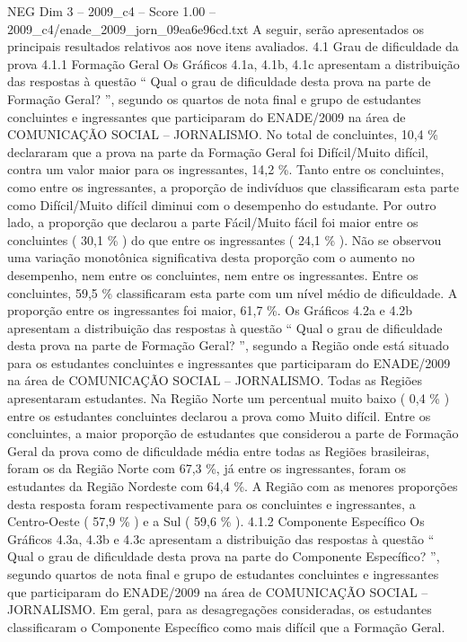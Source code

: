 \begin{textsample}{NEG Dim 3 – 2009\_c4 – Score 1.00 – 2009\_c4/enade\_2009\_jorn\_09ea6e96cd.txt}
A seguir, serão apresentados os principais resultados relativos aos nove itens avaliados. 4.1 Grau de dificuldade da prova 4.1.1 Formação Geral Os Gráficos 4.1a, 4.1b, 4.1c apresentam a distribuição das respostas à questão “ Qual o grau de dificuldade desta prova na parte de Formação Geral? ”, segundo os quartos de nota final e grupo de estudantes concluintes e ingressantes que participaram do ENADE/2009 na área de COMUNICAÇÃO SOCIAL – JORNALISMO.
No total de concluintes, 10,4 \% declararam que a prova na parte da Formação Geral foi Difícil/Muito difícil, contra um valor maior para os ingressantes, 14,2 \%.
Tanto entre os concluintes, como entre os ingressantes, a proporção de indivíduos que classificaram esta parte como Difícil/Muito difícil diminui com o desempenho do estudante.
Por outro lado, a proporção que declarou a parte Fácil/Muito fácil foi maior entre os concluintes ( 30,1 \% ) do que entre os ingressantes ( 24,1 \% ).
Não se observou uma variação monotônica significativa desta proporção com o aumento no desempenho, nem entre os concluintes, nem entre os ingressantes.
Entre os concluintes, 59,5 \% classificaram esta parte com um nível médio de dificuldade.
A proporção entre os ingressantes foi maior, 61,7 \%.
Os Gráficos 4.2a e 4.2b apresentam a distribuição das respostas à questão “ Qual o grau de dificuldade desta prova na parte de Formação Geral? ”, segundo a Região onde está situado para os estudantes concluintes e ingressantes que participaram do ENADE/2009 na área de COMUNICAÇÃO SOCIAL – JORNALISMO.
Todas as Regiões apresentaram estudantes.
Na Região Norte um percentual muito baixo ( 0,4 \% ) entre os estudantes concluintes declarou a prova como Muito difícil.
Entre os concluintes, a maior proporção de estudantes que considerou a parte de Formação Geral da prova como de dificuldade média entre todas as Regiões brasileiras, foram os da Região Norte com 67,3 \%, já entre os ingressantes, foram os estudantes da Região Nordeste com 64,4 \%.
A Região com as menores proporções desta resposta foram respectivamente para os concluintes e ingressantes, a Centro-Oeste ( 57,9 \% ) e a Sul ( 59,6 \% ). 4.1.2 Componente Específico Os Gráficos 4.3a, 4.3b e 4.3c apresentam a distribuição das respostas à questão “ Qual o grau de dificuldade desta prova na parte do Componente Específico? ”, segundo quartos de nota final e grupo de estudantes concluintes e ingressantes que participaram do ENADE/2009 na área de COMUNICAÇÃO SOCIAL – JORNALISMO.
Em geral, para as desagregações consideradas, os estudantes classificaram o Componente Específico como mais difícil que a Formação Geral.

\end{textsample}
